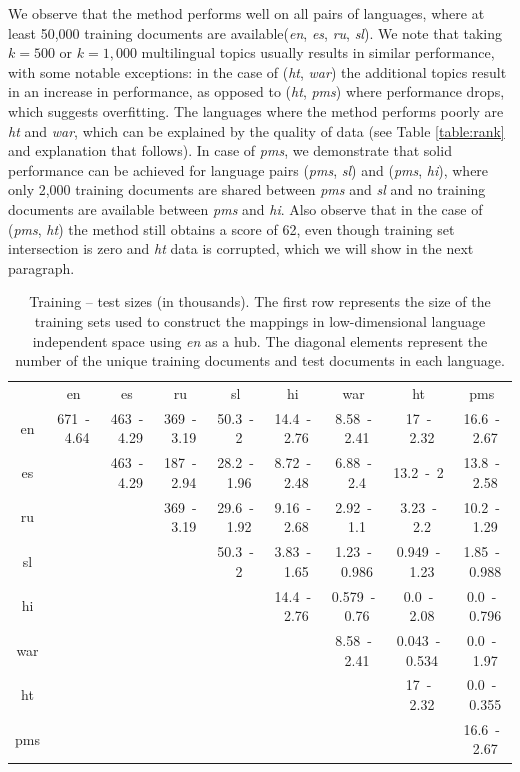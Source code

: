 We observe that the method performs well on all pairs of languages, where at least 50,000 training documents are available(\emph{en}, \emph{es}, \emph{ru}, \emph{sl}). We note that taking $k = 500$ or $k = 1,000$ multilingual topics usually results in similar performance, with some notable exceptions: in the case of (\emph{ht}, \emph{war}) the additional topics result in an increase in performance, as opposed to (\emph{ht}, \emph{pms}) where performance drops, which suggests overfitting. The languages where the method performs poorly are \emph{ht} and \emph{war}, which can be explained by the quality of data (see Table \ref{table:rank} and explanation that follows). In case of \emph{pms}, we demonstrate that solid performance can be achieved for language pairs (\emph{pms}, \emph{sl}) and (\emph{pms}, \emph{hi}), where only 2,000 training documents are shared between \emph{pms} and \emph{sl} and no training documents are available between \emph{pms} and \emph{hi}. Also observe that in the case of (\emph{pms}, \emph{ht}) the method still obtains a score of 62, even though training set intersection is zero and \emph{ht} data is corrupted, which we will show in the next paragraph.
{
\renewcommand\tabcolsep{3pt}
\begin{table}[h!]
\centering
\caption{Training -- test sizes (in thousands).
The first row represents the size of the training sets used to construct the mappings in low-dimensional language independent space using \emph{en} as a hub. The diagonal elements represent the number of the unique training documents and test documents in each language.
}
\label{table:train_test}
{
\small
\begin{tabular}{c|c|c|c|c|c|c|c|c|}
&	en&	es&	ru&	sl&	hi&	war&	ht&	pms\\\cline{1-9}
en&	671~-~4.64&	463~-~4.29&	369~-~3.19&	50.3~-~2&	14.4~-~2.76&	8.58~-~2.41&	 17~-~2.32&	16.6~-~2.67\\
\cline{2-9}
es&	\multicolumn{1}{c|}{}	&	463~-~4.29&	187~-~2.94&	28.2~-~1.96&	8.72~-~2.48&	 6.88~-~2.4&	13.2~-~2&	 13.8~-~2.58\\
\cline{3-9}
ru&	\multicolumn{2}{c|}{}	&	369~-~3.19&	29.6~-~1.92&	9.16~-~2.68&	2.92~-~1.1&	 3.23~-~2.2&	10.2~-~1.29\\
\cline{4-9}
sl&	\multicolumn{3}{c|}{}	&	50.3~-~2&	3.83~-~1.65&	1.23~-~0.986&	0.949~-~1.23&	 1.85~-~0.988\\
\cline{5-9}
hi&	\multicolumn{4}{c|}{}	&	14.4~-~2.76&	0.579~-~0.76&	0.0~-~2.08&	0.0~-~0.796\\
\cline{6-9}
war&	\multicolumn{5}{c|}{}	&	8.58~-~2.41&	0.043~-~0.534&	0.0~-~1.97\\
\cline{7-9}
ht&	\multicolumn{6}{c|}{}	&	17~-~2.32&	0.0~-~0.355\\
\cline{8-9}
pms&	\multicolumn{7}{c|}{}	&	16.6~-~2.67\\
\cline{9-9}
\end{tabular}
}
\end{table}
}

